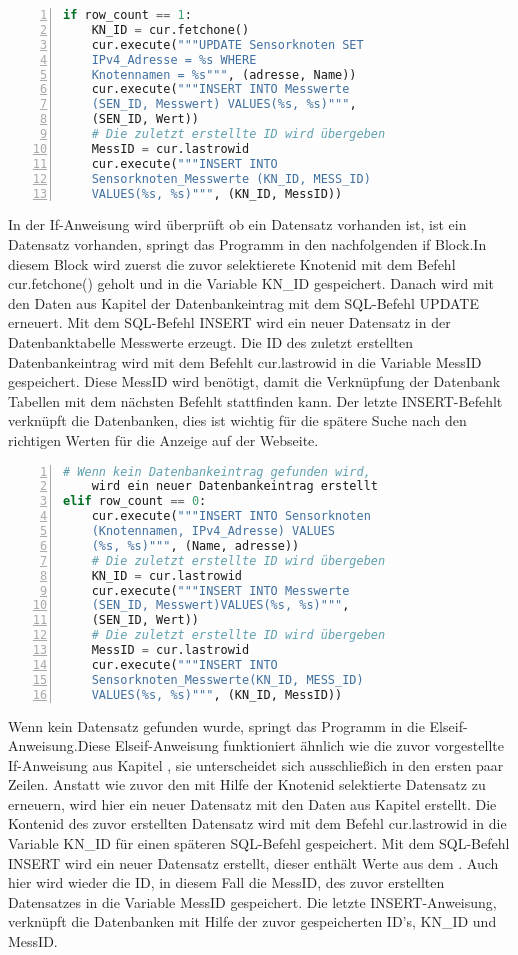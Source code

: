 \begin{lstlisting}[caption=If-Anweisung des Befüllen der Datenbank,frame=single,numbers=left,language=Python]
if row_count == 1:
	KN_ID = cur.fetchone()
	cur.execute("""UPDATE Sensorknoten SET
	IPv4_Adresse = %s WHERE
	Knotennamen = %s""", (adresse, Name))
	cur.execute("""INSERT INTO Messwerte 
	(SEN_ID, Messwert) VALUES(%s, %s)""",
	(SEN_ID, Wert))
	# Die zuletzt erstellte ID wird übergeben
	MessID = cur.lastrowid
	cur.execute("""INSERT INTO 
	Sensorknoten_Messwerte (KN_ID, MESS_ID)
	VALUES(%s, %s)""", (KN_ID, MessID))
\end{lstlisting}\label{If-Anweisung}
\noindent In der If-Anweisung wird überprüft ob ein Datensatz vorhanden ist, ist ein Datensatz vorhanden, springt das Programm in den nachfolgenden if Block.In diesem Block wird zuerst die zuvor selektierete Knotenid mit dem Befehl cur.fetchone() geholt und in die Variable KN\_ID gespeichert. Danach wird mit den Daten aus Kapitel  der Datenbankeintrag mit dem SQL-Befehl UPDATE erneuert. Mit dem SQL-Befehl INSERT wird ein neuer Datensatz in der Datenbanktabelle Messwerte erzeugt. Die ID des zuletzt erstellten Datenbankeintrag wird mit dem Befehlt cur.lastrowid in die Variable MessID gespeichert. Diese MessID wird benötigt, damit die Verknüpfung der Datenbank Tabellen mit dem nächsten Befehlt stattfinden kann. Der letzte INSERT-Befehlt verknüpft die Datenbanken, dies ist wichtig für die spätere Suche nach den richtigen Werten für die Anzeige auf der Webseite. 
\begin{lstlisting}[caption=Ifelse-Anweisung des Befüllen der Datenbank,frame=single,numbers=left,language=Python]
	# Wenn kein Datenbankeintrag gefunden wird,
	wird ein neuer Datenbankeintrag erstellt
elif row_count == 0:
	cur.execute("""INSERT INTO Sensorknoten
	(Knotennamen, IPv4_Adresse) VALUES
	(%s, %s)""", (Name, adresse))
	# Die zuletzt erstellte ID wird übergeben
	KN_ID = cur.lastrowid
	cur.execute("""INSERT INTO Messwerte
	(SEN_ID, Messwert)VALUES(%s, %s)""",
	(SEN_ID, Wert))
	# Die zuletzt erstellte ID wird übergeben
	MessID = cur.lastrowid
	cur.execute("""INSERT INTO 
	Sensorknoten_Messwerte(KN_ID, MESS_ID)
	VALUES(%s, %s)""", (KN_ID, MessID))
\end{lstlisting}
\noindent Wenn kein Datensatz gefunden wurde, springt das Programm in die Elseif-Anweisung.Diese Elseif-Anweisung funktioniert ähnlich wie die zuvor vorgestellte If-Anweisung aus Kapitel , sie unterscheidet sich ausschließich in den ersten paar Zeilen. Anstatt wie zuvor den mit Hilfe der Knotenid selektierte Datensatz zu erneuern, wird hier ein neuer Datensatz mit den Daten aus Kapitel  erstellt. Die Kontenid des zuvor erstellten Datensatz wird mit dem Befehl cur.lastrowid in die Variable KN\_ID für einen späteren SQL-Befehl gespeichert. Mit dem SQL-Befehl INSERT wird ein neuer Datensatz erstellt, dieser enthält Werte aus dem . Auch hier wird wieder die ID, in diesem Fall die MessID, des zuvor erstellten Datensatzes in die Variable MessID gespeichert. Die letzte INSERT-Anweisung, verknüpft die Datenbanken mit Hilfe der zuvor gespeicherten ID's, KN\_ID und MessID.   
